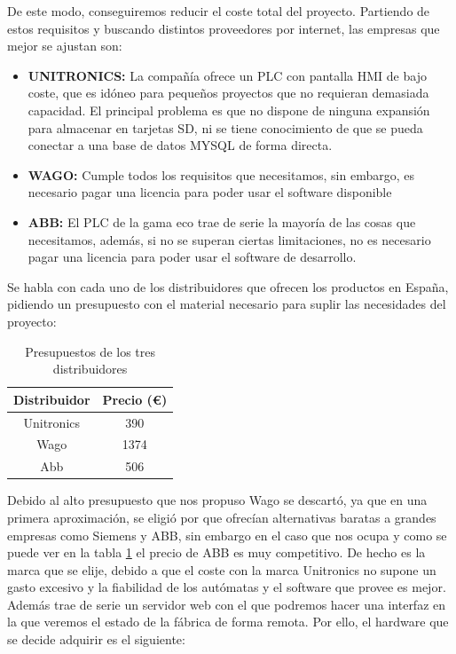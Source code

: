 De este modo, conseguiremos reducir el coste total del proyecto. Partiendo de estos requisitos y buscando distintos proveedores por internet, las empresas que mejor se ajustan son:

\begin{itemize}
		\item{\textbf{UNITRONICS:} La compañía ofrece un PLC con pantalla HMI de bajo coste, que es idóneo para pequeños proyectos que no requieran demasiada capacidad. El principal problema es que no dispone de ninguna expansión para almacenar en tarjetas SD, ni se tiene conocimiento de que se pueda conectar a una base de datos MYSQL de forma directa.}
		\item{\textbf{WAGO:} Cumple todos los requisitos que necesitamos, sin embargo, es necesario pagar una licencia para poder usar el software disponible}
		\item{\textbf{ABB:} El PLC de la gama eco trae de serie la mayoría de las cosas que necesitamos, además, si no se superan ciertas limitaciones, no es necesario pagar una licencia para poder usar el software de desarrollo.}
\end{itemize}

Se habla con cada uno de los distribuidores que ofrecen los productos en España, pidiendo un presupuesto con el material necesario para suplir las necesidades del proyecto:

\begin{table}[H]
\centering
\begin{tabular}{cc}
{\bf Distribuidor} & {\bf Precio (\euro{})} \\ \hline
Unitronics         & 390              \\
Wago               & 1374             \\
Abb                & 506              \\ \hline
\end{tabular}
\caption{Presupuestos de los tres distribuidores}
\label{tab:presupuestos}
\end{table}

Debido al alto presupuesto que nos propuso Wago se descartó, ya que en una primera aproximación, se eligió por que ofrecían alternativas baratas a grandes empresas como Siemens y ABB, sin embargo en el caso que nos ocupa y como se puede ver en la tabla \ref{tab:presupuestos} el precio de ABB es muy competitivo. De hecho es la marca que se elije, debido a que el coste con la marca Unitronics no supone un gasto excesivo y la fiabilidad de los autómatas y el software que provee es mejor. Además trae de serie un servidor web con el que podremos hacer una interfaz en la que veremos el estado de la fábrica de forma remota. Por ello, el hardware que se decide adquirir es el siguiente:

